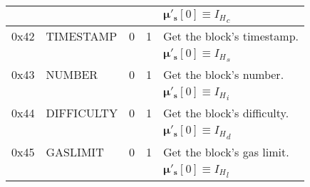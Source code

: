 \documentclass[9pt,oneside]{amsart}
\begin{document}
\begin{tabular*}{\columnwidth}[h]{rlrrl}
&&&& $\boldsymbol{\mu}'_\mathbf{s}[0] \equiv {I_H}_c$ \\
\midrule
0x42 & {\small TIMESTAMP} & 0 & 1 & Get the block's timestamp. \\
&&&& $\boldsymbol{\mu}'_\mathbf{s}[0] \equiv {I_H}_s$ \\
\midrule
0x43 & {\small NUMBER} & 0 & 1 & Get the block's number. \\
&&&& $\boldsymbol{\mu}'_\mathbf{s}[0] \equiv {I_H}_i$ \\
\midrule
0x44 & {\small DIFFICULTY} & 0 & 1 & Get the block's difficulty. \\
&&&& $\boldsymbol{\mu}'_\mathbf{s}[0] \equiv {I_H}_d$ \\
\midrule
0x45 & {\small GASLIMIT} & 0 & 1 & Get the block's gas limit. \\
&&&& $\boldsymbol{\mu}'_\mathbf{s}[0] \equiv {I_H}_l$ \\
\bottomrule
\end{tabular*}
\end{document}
